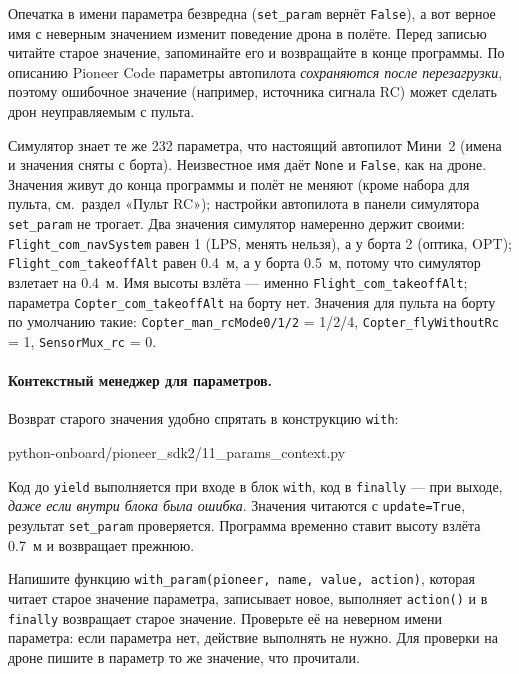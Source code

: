 \begin{warnbox}
Опечатка в имени параметра безвредна (\verb|set_param| вернёт \verb|False|), а вот верное имя с неверным значением изменит поведение дрона в полёте. Перед записью читайте старое значение, запоминайте его и возвращайте в конце программы. По описанию Pioneer Code параметры автопилота \emph{сохраняются после перезагрузки}, поэтому ошибочное значение (например, источника сигнала RC) может сделать дрон неуправляемым с пульта.
\end{warnbox}

\begin{infobox}
Симулятор знает те же 232 параметра, что настоящий автопилот Мини~2 (имена и значения сняты с борта). Неизвестное имя даёт \verb|None| и \verb|False|, как на дроне. Значения живут до конца программы и полёт не меняют (кроме набора для пульта, см.\ раздел «Пульт RC»); настройки автопилота в панели симулятора \verb|set_param| не трогает. Два значения симулятор намеренно держит своими: \texttt{Flight\_com\_navSystem} равен 1 (LPS, менять нельзя), а у борта 2 (оптика, OPT); \texttt{Flight\_com\_takeoffAlt} равен 0.4~м, а у борта 0.5~м, потому что симулятор взлетает на 0.4~м. Имя высоты взлёта --- именно \texttt{Flight\_com\_takeoffAlt}; параметра \texttt{Copter\_com\_takeoffAlt} на борту нет. Значения для пульта на борту по умолчанию такие: \texttt{Copter\_man\_rcMode0/1/2} = 1/2/4, \texttt{Copter\_flyWithoutRc} = 1, \texttt{SensorMux\_rc} = 0.
\end{infobox}

\paragraph{Контекстный менеджер для параметров.} Возврат старого значения удобно спрятать в конструкцию \verb|with|:

\begin{codefile}[python]{python-onboard/pioneer_sdk2/11_params_context.py}
\end{codefile}

Код до \verb|yield| выполняется при входе в блок \verb|with|, код в \verb|finally| --- при выходе, \emph{даже если внутри блока была ошибка}. Значения читаются с \verb|update=True|, результат \verb|set_param| проверяется. Программа временно ставит высоту взлёта 0.7~м и возвращает прежнюю.

\begin{taskbox}
Напишите функцию \verb|with_param(pioneer, name, value, action)|, которая читает старое значение параметра, записывает новое, выполняет \verb|action()| и в \verb|finally| возвращает старое значение. Проверьте её на неверном имени параметра: если параметра нет, действие выполнять не нужно. Для проверки на дроне пишите в параметр то же значение, что прочитали.
\end{taskbox}
